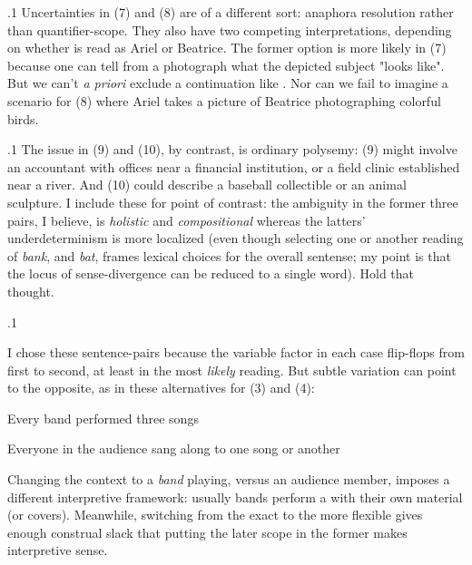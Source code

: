 \documentclass[11pt, twocolumn]{article}
\begin{document}
\p.1{%
Uncertainties in \exsRef(7) and \exsRef(8) are of a different sort: anaphora resolution rather than quantifier-scope.
They also have two competing interpretations, depending on whether  is read as Ariel or Beatrice.  The
former option is more likely in \exsRef(7) because one can tell from a photograph what the depicted subject
"looks like".  But we can't \textit{a priori} exclude a continuation like .  Nor can we fail to imagine a scenario for \exsRef(8) where Ariel takes a picture of
Beatrice photographing colorful birds.
} %

\p.1{%
The issue in \exsRef(9) and \exsRef(10), by contrast, is ordinary polysemy: \exsRef(9) might involve an
accountant with offices near a financial institution, or a field clinic established
near a river.  And \exsRef(10) could describe a baseball collectible or an animal sculpture.
I include these for point of contrast: the ambiguity in the former three pairs,
I believe, is \textit{holistic} and \textit{compositional} whereas the latters' underdeterminism
is more localized (even though selecting one or another reading of \textit{bank}, and
\textit{bat}, frames lexical choices for the overall sentense; my point is that
the locus of sense-divergence can be reduced to a single word).  Hold that thought.
} %

\p.1{%
I chose these sentence-pairs because the variable factor in each case flip-flops from first to second, at least
in the most \textit{likely} reading.  But subtle variation can point to the opposite, as in these alternatives
for \exsRef(3) and \exsRef(4):

\begin{exsGroup}

\exsItem{}   Every band performed three songs

\exsItem{}   Everyone in the audience sang along to one song or another

\end{exsGroup}

\nip
Changing the context to a \textit{band} playing, versus an audience member, imposes a different interpretive
framework: usually bands perform a  with their own material (or covers).  Meanwhile, switching
from the exact  to the more flexible  gives enough construal slack that
putting the later scope in the former makes interpretive sense.
} %
\end{document}
